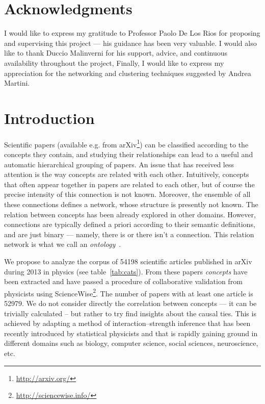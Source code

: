 \documentclass[a4paper,12pt,twoside]{article}
\begin{document}
\section*{Acknowledgments}
I would like to express my gratitude to Professor Paolo De Los Rios for proposing and supervising this project --- his guidance has been very valuable. I would also like to thank Duccio Malinverni  for his support, advice, and continuous availability throughout the project,
Finally, I would like to express my appreciation for the networking and clustering techniques suggested by Andrea Martini.
{\hypersetup{linkcolor=black}
\small
\tableofcontents
}
\newpage
\section{Introduction}

Scientific papers (available e.g. from arXiv\footnote{\url{http://arxiv.org/}}) can be classified according to the concepts they contain, and studying their relationships can lead to a useful and automatic hierarchical grouping of papers.
An issue that has received less attention is the way concepts are related with each other.
Intuitively, concepts that often appear together in papers are related to each other, but of course the precise intensity of this connection is not known.
Moreover, the ensemble of all these connections defines a network, whose structure is presently not known.
The relation between concepts has been already explored in other domains. However, connections are typically defined a priori according to their semantic definitions, and are just binary --- namely, there is or there isn't a connection. This relation network is what we call an {\em ontology}~\cite{guarino1998}.

We propose to analyze the corpus of 54198 scientific articles published in arXiv during 2013 in physics (see table~\ref{tab:cats}).
From these papers {\em concepts} have been extracted and have passed a procedure of collaborative validation from physicists using ScienceWise\footnote{\url{http://sciencewise.info/}}.
The number of papers with at least one article is 52979.
We do not consider directly the correlation between concepts --- it can be trivially calculated --  but rather to try find insights about the causal ties.
This is achieved by adapting a method of interaction--strength inference that has been recently introduced by statistical physicists and that is rapidly gaining ground in different domains such as biology, computer science, social sciences, neuroscience, etc.
\end{document}
